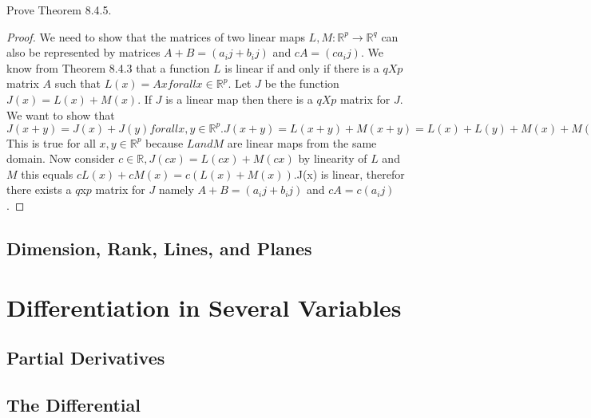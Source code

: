 \documentclass[12pt]{book}
\newcommand{\R}{\mathbb{R}}
\newenvironment{exercise}[2][Exercise]{\begin{trivlist}
\item[\hskip \labelsep {\bfseries #1}\hskip \labelsep {\bfseries #2.}]}{\end{trivlist}}
\begin{document}
\begin{exercise}{8.4.9}

\end{exercise}
\begin{exercise}{8.4.10}

\end{exercise}
\begin{exercise}{8.4.12}
Prove Theorem 8.4.5. 
\begin{proof}
We need to show that the matrices of two linear maps $L,M: \R^p \to \R^q$ can also be represented by matrices $A + B = (a_ij + b_ij)$ and $cA = (ca_ij)$. We know from Theorem 8.4.3 that a function $L$ is linear if and only if there is a $qXp$ matrix $A$ such that $L(x) = Ax for all x\in \R^p$. Let $J$ be the function $J(x) = L(x) + M(x)$. If $J$ is a linear map then there is a $qXp$ matrix for $J$. We want to show that $J(x + y) = J(x) + J(y) for all x,y \in \R^p. J(x+y) = L(x+y) + M(x+y) = L(x) + L(y) + M(x) + M(y) = L(x) + M(x) + L(y) + M(y) = (L+M)(x) + (L+M)(x) = J(x) + J(y)$ This is true for all $x,y \in \R^p$ because $L and M$ are linear maps from the same domain. Now consider $c \in \R, J(cx) = L(cx) + M(cx)$ by linearity of $L$ and $M$ this equals $cL(x) + cM(x) = c(L(x) + M(x)). $J(x) is linear, therefor there exists a $q$x$p$ matrix for $J$ namely $A + B = (a_ij + b_ij)$ and $cA = c(a_ij)$. 

\end{proof}

\end{exercise}

\section{Dimension, Rank, Lines, and Planes}



\chapter{Differentiation in Several Variables}
\section{Partial Derivatives}



\section{The Differential}
\end{document}
